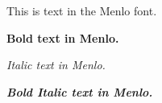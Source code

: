 \documentclass{article}
\begin{document}
This is text in the Menlo font.

\textbf{Bold text in Menlo.}

\textit{Italic text in Menlo.}

\textbf{\textit{Bold Italic text in Menlo.}}
\end{document}
